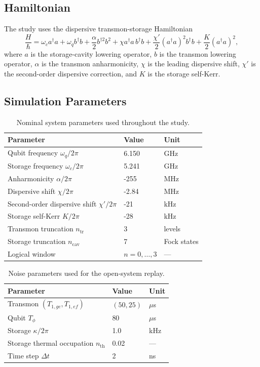 \documentclass[aps,pra,twocolumn,reprint,amsmath,amssymb]{revtex4-2}
\begin{document}
\subsection{Hamiltonian}

The study uses the dispersive transmon-storage Hamiltonian
\begin{equation}
\frac{H}{\hbar} =
\omega_c a^\dagger a +
\omega_q b^\dagger b +
\frac{\alpha}{2} b^{\dagger 2} b^2 +
\chi a^\dagger a\, b^\dagger b +
\frac{\chi'}{2}(a^\dagger a)^2 b^\dagger b +
\frac{K}{2}(a^\dagger a)^2,
\end{equation}
where $a$ is the storage-cavity lowering operator, $b$ is the transmon lowering operator, $\alpha$ is the transmon anharmonicity, $\chi$ is the leading dispersive shift, $\chi'$ is the second-order dispersive correction, and $K$ is the storage self-Kerr.

\subsection{Simulation Parameters}

\begin{table}[tp]
\centering
\caption{Nominal system parameters used throughout the study.}
\begin{tabular}{@{} l l l @{}}
\toprule
Parameter & {Value} & Unit \\
\midrule
Qubit frequency $\omega_q/2\pi$ & 6.150 & GHz \\
Storage frequency $\omega_c/2\pi$ & 5.241 & GHz \\
Anharmonicity $\alpha/2\pi$ & -255 & MHz \\
Dispersive shift $\chi/2\pi$ & -2.84 & MHz \\
Second-order dispersive shift $\chi'/2\pi$ & -21 & kHz \\
Storage self-Kerr $K/2\pi$ & -28 & kHz \\
Transmon truncation $n_\mathrm{tr}$ & 3 & levels \\
Storage truncation $n_\mathrm{cav}$ & 7 & Fock states \\
Logical window & $n=0,\ldots,3$ & --- \\
\bottomrule
\end{tabular}
\label{tab:params}
\end{table}

\begin{table}[tp]
\centering
\caption{Noise parameters used for the open-system replay.}
\begin{tabular}{@{} l l l @{}}
\toprule
Parameter & Value & Unit \\
\midrule
Transmon $(T_{1,ge}, T_{1,ef})$ & $(50, 25)$ & $\mu$s \\
Qubit $T_\phi$ & 80 & $\mu$s \\
Storage $\kappa/2\pi$ & 1.0 & kHz \\
Storage thermal occupation $n_\mathrm{th}$ & 0.02 & --- \\
Time step $\Delta t$ & 2 & ns \\
\bottomrule
\end{tabular}
\label{tab:noise}
\end{table}
\end{document}
